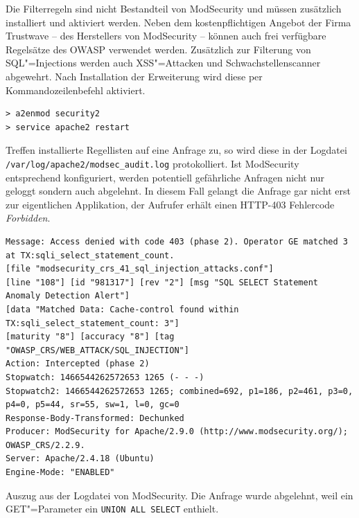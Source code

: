 Die Filterregeln sind nicht Bestandteil von ModSecurity und müssen zusätzlich installiert und aktiviert werden. Neben dem kostenpflichtigen Angebot der Firma Trustwave -- des Herstellers von ModSecurity -- können auch frei verfügbare Regelsätze des OWASP verwendet werden. Zusätzlich zur Filterung von SQL"=Injections werden auch XSS"=Attacken und Schwachstellenscanner abgewehrt. Nach Installation der Erweiterung wird diese per Kommandozeilenbefehl aktiviert.

\begin{listing}[ht!]
\begin{verbatim}
> a2enmod security2
> service apache2 restart
\end{verbatim}
\end{listing}


Treffen installierte Regellisten auf eine Anfrage zu, so wird diese in der Logdatei \texttt{/var/log/apache2/modsec\_audit.log} protokolliert. Ist ModSecurity entsprechend konfiguriert, werden potentiell gefährliche Anfragen nicht nur geloggt sondern auch abgelehnt. In diesem Fall gelangt die Anfrage gar nicht erst zur eigentlichen Applikation, der Aufrufer erhält einen HTTP-403 Fehlercode \emph{Forbidden}.

\begin{listing}[ht!]
\begin{margincap}

\begin{verbatim}
Message: Access denied with code 403 (phase 2). Operator GE matched 3 at TX:sqli_select_statement_count.
[file "modsecurity_crs_41_sql_injection_attacks.conf"]
[line "108"] [id "981317"] [rev "2"] [msg "SQL SELECT Statement Anomaly Detection Alert"]
[data "Matched Data: Cache-control found within TX:sqli_select_statement_count: 3"]
[maturity "8"] [accuracy "8"] [tag "OWASP_CRS/WEB_ATTACK/SQL_INJECTION"]
Action: Intercepted (phase 2)
Stopwatch: 1466544262572653 1265 (- - -)
Stopwatch2: 1466544262572653 1265; combined=692, p1=186, p2=461, p3=0, p4=0, p5=44, sr=55, sw=1, l=0, gc=0
Response-Body-Transformed: Dechunked
Producer: ModSecurity for Apache/2.9.0 (http://www.modsecurity.org/); OWASP_CRS/2.2.9.
Server: Apache/2.4.18 (Ubuntu)
Engine-Mode: "ENABLED"
\end{verbatim}
\caption[Logdatei von ModSecurity]{Auszug aus der Logdatei von ModSecurity. Die Anfrage wurde abgelehnt, weil ein GET"=Parameter ein \texttt{UNION ALL SELECT} enthielt.}
\end{margincap}
\end{listing}




